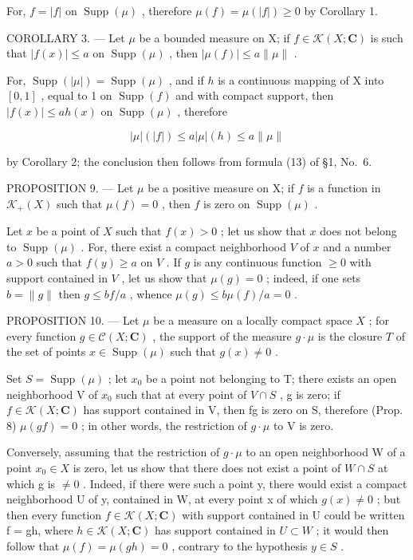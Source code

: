 For, \(f = |f|\) on \(\operatorname{Supp}(\mu)\) , therefore \(\mu(f) = \mu(|f|) \geqslant 0\) by Corollary 1.

COROLLARY 3. --- Let \(\mu\) be a bounded measure on X; if \(f \in \mathcal{K}(X; \mathbf{C})\) is such that \(|f(x)| \leqslant a\) on \(\operatorname{Supp}(\mu)\) , then \(|\mu(f)| \leqslant a \| \mu \|\) .

For, \(\operatorname{Supp}(|\mu|) = \operatorname{Supp}(\mu)\) , and if \(h\) is a continuous mapping of X into \([0,1]\) , equal to 1 on \(\operatorname{Supp}(f)\) and with compact support, then \(|f(x)| \leqslant ah(x)\) on \(\operatorname{Supp}(\mu)\) , therefore

\[
| \mu | (| f |) \leqslant a | \mu | (h) \leqslant a \| \mu \|
\]

by Corollary 2; the conclusion then follows from formula (13) of §1, No.~6.

PROPOSITION 9. --- Let \(\mu\) be a positive measure on X; if \(f\) is a function in \(\mathcal{K}_{+}(X)\) such that \(\mu(f)=0\) , then \(f\) is zero on \(\operatorname{Supp}(\mu)\) .

Let \(x\) be a point of \(X\) such that \(f(x) > 0\) ; let us show that \(x\) does not belong to \(\operatorname{Supp}(\mu)\) . For, there exist a compact neighborhood \(V\) of \(x\) and a number \(a > 0\) such that \(f(y) \geqslant a\) on \(V\) . If \(g\) is any continuous function \(\geqslant 0\) with support contained in \(V\) , let us show that \(\mu(g) = 0\) ; indeed, if one sets \(b = \|g\|\) then \(g \leqslant bf/a\) , whence \(\mu(g) \leqslant b\mu(f)/a = 0\) .

PROPOSITION 10. --- Let \(\mu\) be a measure on a locally compact space \(X\) ; for every function \(g \in \mathcal{C}(X; \mathbf{C})\) , the support of the measure \(g \cdot \mu\) is the closure \(T\) of the set of points \(x \in \operatorname{Supp}(\mu)\) such that \(g(x) \neq 0\) .

Set \(S = \operatorname{Supp}(\mu)\) ; let \(x_{0}\) be a point not belonging to T; there exists an open neighborhood V of \(x_{0}\) such that at every point of \(V \cap S\) , g is zero; if \(f \in \mathcal{K}(X; \mathbf{C})\) has support contained in V, then fg is zero on S, therefore (Prop. 8) \(\mu(gf) = 0\) ; in other words, the restriction of \(g \cdot \mu\) to V is zero.

Conversely, assuming that the restriction of \(g \cdot \mu\) to an open neighborhood W of a point \(x_{0} \in X\) is zero, let us show that there does not exist a point of \(W \cap S\) at which g is \(\neq 0\) . Indeed, if there were such a point y, there would exist a compact neighborhood U of y, contained in W, at every point x of which \(g(x) \neq 0\) ; but then every function \(f \in \mathcal{K}(X; \mathbf{C})\) with support contained in U could be written f = gh, where \(h \in \mathcal{K}(X; \mathbf{C})\) has support contained in \(U \subset W\) ; it would then follow that \(\mu(f) = \mu(gh) = 0\) , contrary to the hypothesis \(y \in S\) .

